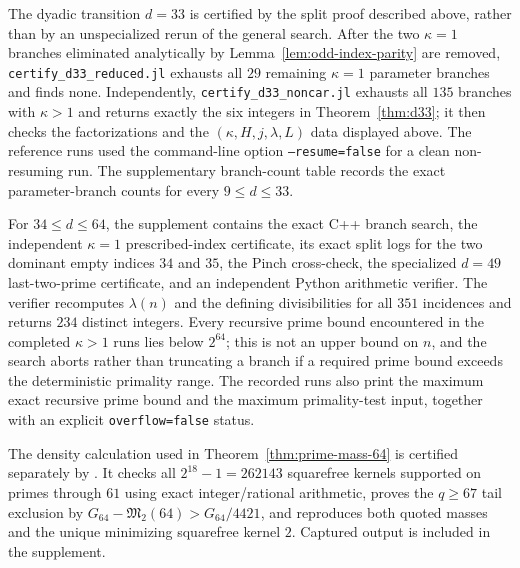 \documentclass[11pt]{article}
\begin{document}
The dyadic transition $d=33$ is certified by the split proof described above,
rather than by an unspecialized rerun of the general search.  After the two
$\kappa=1$ branches eliminated analytically by Lemma~\ref{lem:odd-index-parity}
are removed, \texttt{certify\_d33\_reduced.jl} exhausts all $29$ remaining
$\kappa=1$ parameter branches and finds none.  Independently,
\texttt{certify\_d33\_noncar.jl} exhausts all $135$ branches with $\kappa>1$
and returns exactly the six integers in Theorem~\ref{thm:d33}; it then checks
the factorizations and the $(\kappa,H,j,\lambda,L)$ data displayed above.  The
reference runs used the command-line option \texttt{--resume=false} for a clean non-resuming run.  The supplementary
branch-count table records the exact parameter-branch counts for every
$9\le d\le33$.

For $34\le d\le64$, the supplement contains the exact C++ branch search,
the independent $\kappa=1$ prescribed-index certificate, its exact split logs
for the two dominant empty indices $34$ and $35$, the Pinch cross-check, the
specialized $d=49$ last-two-prime certificate, and an independent Python
arithmetic verifier.  The verifier recomputes $\lambda(n)$ and the defining
divisibilities for all $351$ incidences and returns $234$ distinct integers.
Every recursive prime bound encountered in the completed $\kappa>1$ runs lies
below $2^{64}$; this is not an upper bound on $n$, and the search aborts rather
than truncating a branch if a required prime bound exceeds the deterministic
primality range.  The recorded runs also print the maximum exact recursive
prime bound and the maximum primality-test input, together with an explicit
\texttt{overflow=false} status.

The density calculation used in Theorem~\ref{thm:prime-mass-64} is certified
separately by .  It checks all
$2^{18}-1=262143$ squarefree kernels supported on primes through $61$ using
exact integer/rational arithmetic, proves the $q\ge67$ tail exclusion by
$G_{64}-\mathfrak M_2(64)>G_{64}/4421$, and reproduces both quoted masses and
the unique minimizing squarefree kernel $2$.  Captured output is included in
the supplement.
\end{document}
